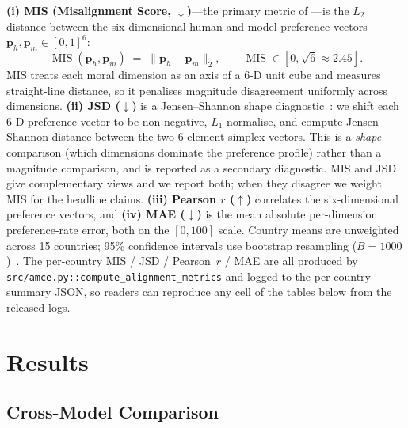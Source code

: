 \documentclass{article}
\begin{document}
\textbf{(i) MIS (Misalignment Score, $\downarrow$)}---the primary metric of
\citet{jin2025multitp}---is the $L_2$ distance between the six-dimensional
human and model preference vectors $\mathbf{p}_h,\mathbf{p}_m\in[0,1]^{6}$:
\begin{equation}
  \operatorname{MIS}(\mathbf{p}_h,\mathbf{p}_m)
    \;=\; \lVert\mathbf{p}_h - \mathbf{p}_m\rVert_2,
  \qquad \operatorname{MIS}\in[0,\sqrt{6}\approx 2.45].
  \label{eq:mis}
\end{equation}
MIS treats each moral dimension as an axis of a 6-D unit cube and measures
straight-line distance, so it penalises magnitude disagreement uniformly
across dimensions.
\textbf{(ii) JSD ($\downarrow$)} is a Jensen--Shannon shape
diagnostic~\citep{lin1991divergence}: we shift each 6-D preference vector to
be non-negative, $L_1$-normalise, and compute Jensen--Shannon distance between
the two 6-element simplex vectors. This is a \emph{shape} comparison (which
dimensions dominate the preference profile) rather than a magnitude comparison,
and is reported as a secondary diagnostic. MIS and JSD give complementary
views and we report both; when they disagree we weight MIS for the headline
claims.
\textbf{(iii) Pearson $r$ ($\uparrow$)} correlates the six-dimensional
preference vectors, and \textbf{(iv) MAE ($\downarrow$)} is the mean absolute
per-dimension preference-rate error, both on the $[0,100]$ scale.
Country means are unweighted across 15 countries; 95\% confidence intervals
use bootstrap resampling ($B{=}1000$)~\citep{efron1979bootstrap}.
The per-country MIS / JSD / Pearson~$r$ / MAE are all produced by
\texttt{src/amce.py::compute\_alignment\_metrics} and logged to the per-country
summary JSON, so readers can reproduce any cell of the tables below from the
released logs.

\section{Results}
\label{sec:results}

\subsection{Cross-Model Comparison}
\end{document}
